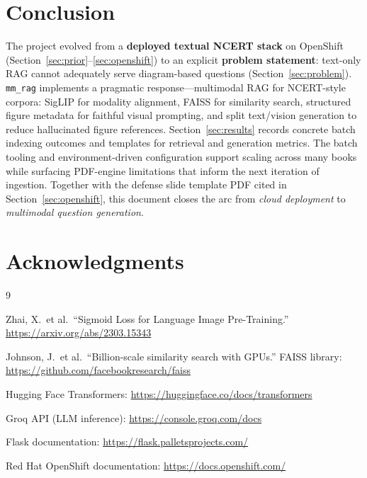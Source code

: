 \documentclass[11pt]{article}
\begin{document}
\section{Conclusion}
\label{sec:conclusion}

The project evolved from a \textbf{deployed textual NCERT stack} on OpenShift (Section~\ref{sec:prior}--\ref{sec:openshift}) to an explicit \textbf{problem statement}: text-only RAG cannot adequately serve diagram-based questions (Section~\ref{sec:problem}). \texttt{mm\_rag} implements a pragmatic response---multimodal RAG for NCERT-style corpora: SigLIP for modality alignment, FAISS for similarity search, structured figure metadata for faithful visual prompting, and split text/vision generation to reduce hallucinated figure references. Section~\ref{sec:results} records concrete batch indexing outcomes and templates for retrieval and generation metrics. The batch tooling and environment-driven configuration support scaling across many books while surfacing PDF-engine limitations that inform the next iteration of ingestion. Together with the defense slide template PDF cited in Section~\ref{sec:openshift}, this document closes the arc from \emph{cloud deployment} to \emph{multimodal question generation}.

\section{Acknowledgments}


\newpage
\begin{thebibliography}{9}

 Zhai, X.\ et al.\ ``Sigmoid Loss for Language Image Pre-Training.'' \url{https://arxiv.org/abs/2303.15343}

 Johnson, J.\ et al.\ ``Billion-scale similarity search with GPUs.'' FAISS library: \url{https://github.com/facebookresearch/faiss}

 Hugging Face Transformers: \url{https://huggingface.co/docs/transformers}

 Groq API (LLM inference): \url{https://console.groq.com/docs}

 Flask documentation: \url{https://flask.palletsprojects.com/}

 Red Hat OpenShift documentation: \url{https://docs.openshift.com/}

\end{thebibliography}
\end{document}
